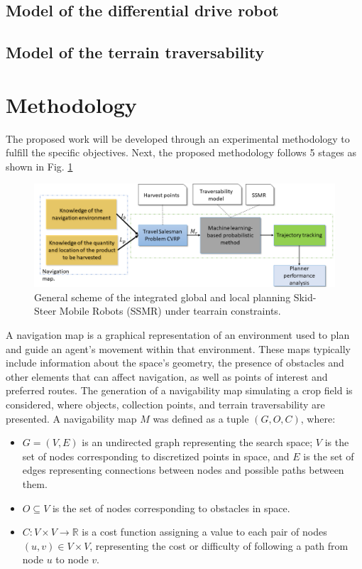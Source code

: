 \documentclass[conference]{IEEEtran}
\begin{document}
\subsection{Model of the differential drive robot}
\subsection{Model of the terrain traversability}
\section{Methodology}
\label{Sec::methdology}

The proposed work will be developed through an experimental methodology to fulfill the specific objectives. Next, the proposed methodology follows 5 stages as shown in Fig. \ref{Fig::esquema_basico_planificacion}

\begin{figure}[t!]
	\centering
\includegraphics[width=165mm]{Images/esquema_basico_planificacion.png}
	\caption{General scheme of the integrated global and local planning Skid-Steer Mobile Robots (SSMR) under tearrain constraints.}
	\label{Fig::esquema_basico_planificacion}
\end{figure}

A navigation map is a graphical representation of an environment used to plan and guide an agent's movement within that environment. These maps typically include information about the space's geometry, the presence of obstacles and other elements that can affect navigation, as well as points of interest and preferred routes. The generation of a navigability map simulating a crop field is considered, where objects, collection points, and terrain traversability are presented. A navigability map \(M\) was defined as a tuple \((G, O, C)\), where:
\begin{itemize}
\item \(G = (V, E)\) is an undirected graph representing the search space; \(V\) is the set of nodes corresponding to discretized points in space, and \(E\) is the set of edges representing connections between nodes and possible paths between them.
\item \(O \subseteq V\) is the set of nodes corresponding to obstacles in space.
\item \(C: V \times V \to \mathbb{R}\) is a cost function assigning a value to each pair of nodes \((u, v) \in V \times V\), representing the cost or difficulty of following a path from node \(u\) to node \(v\).
\end{itemize}
\end{document}
